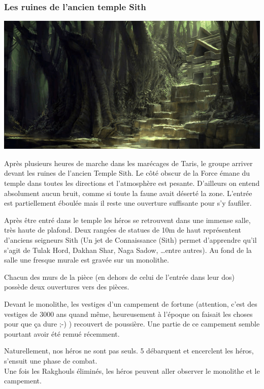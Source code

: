 \subsubsection{Les ruines de l’ancien temple Sith}
\noindent\includegraphics[width=\linewidth]{_img/places/taris-temple-sith.png}

Après plusieurs heures de marche dans les marécages de Taris, le groupe arriver devant les ruines de l’ancien Temple Sith. Le côté obscur de la Force émane du temple dans toutes les directions et l’atmosphère est pesante. D’ailleurs on entend absolument aucun bruit, comme si toute la faune avait déserté la zone. L’entrée est partiellement éboulée mais il reste une ouverture suffisante pour s’y faufiler.

Après être entré dans le temple les héros se retrouvent dans une immense salle, très haute de plafond. Deux rangées de statues de 10m de haut représentent d’anciens seigneurs Sith (Un jet de Connaissance (Sith) permet d’apprendre qu’il s’agit de Tulak Hord, Dakhan Shar, Naga Sadow, \ldots entre autres). Au fond de la salle une fresque murale est gravée sur un monolithe.

Chacun des murs de la pièce (en dehors de celui de l’entrée dans leur dos) possède deux ouvertures vers des pièces.

Devant le monolithe, les vestiges d’un campement de fortune (attention, c’est des vestiges de 3000 ans quand même, heureusement à l’époque on faisait les choses pour que ça dure ;-) ) recouvert de poussière. Une partie de ce campement semble pourtant avoir été remué récemment.

Naturellement, nos héros ne sont pas seuls. 5  débarquent et encerclent les héros, s’ensuit une phase de combat.
\\

Une fois les Rakghouls éliminés, les héros peuvent aller observer le monolithe et le campement.
\\


